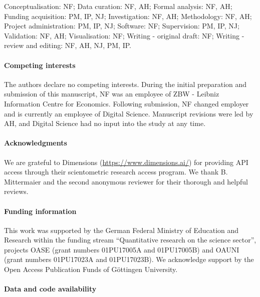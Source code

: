 \documentclass[
]{article}
\begin{document}
Conceptualisation: NF; Data curation: NF, AH; Formal analysis: NF, AH; Funding acquisition: PM, IP, NJ; Investigation: NF, AH; Methodology: NF, AH; Project administration: PM, IP, NJ; Software: NF; Supervision: PM, IP, NJ; Validation: NF, AH; Visualisation: NF; Writing - original draft: NF; Writing - review and editing: NF, AH, NJ, PM, IP.

\hypertarget{competing-interests}{%
\paragraph*{Competing interests}\label{competing-interests}}

The authors declare no competing interests. During the initial preparation and submission of this manuscript, NF was an employee of ZBW - Leibniz Information Centre for Economics. Following submission, NF changed employer and is currently an employee of Digital Science. Manuscript revisions were led by AH, and Digital Science had no input into the study at any time.

\hypertarget{acknowledgments}{%
\paragraph*{Acknowledgments}\label{acknowledgments}}

We are grateful to Dimensions (\url{https://www.dimensions.ai/}) for providing API access through their scientometric research access program. We thank B. Mittermaier and the second anonymous reviewer for their thorough and helpful reviews.

\hypertarget{funding-information}{%
\paragraph*{Funding information}\label{funding-information}}

This work was supported by the German Federal Ministry of Education and Research within the
funding stream ``Quantitative research on the science sector'', projects OASE (grant numbers 01PU17005A and 01PU17005B) and OAUNI (grant numbers 01PU17023A and 01PU17023B). We acknowledge support by the Open Access Publication Funds of Göttingen University.

\hypertarget{data-and-code-availability}{%
\paragraph*{Data and code availability}\label{data-and-code-availability}}
\end{document}
